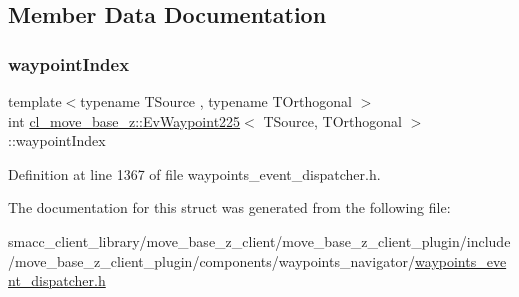 \subsection{Member Data Documentation}
\mbox{\label{structcl__move__base__z_1_1EvWaypoint225_a0770eb0d7a9156e6aa75406eb56d97b4}} 
\subsubsection{\texorpdfstring{waypoint\+Index}{waypointIndex}}
{\footnotesize\ttfamily template$<$typename T\+Source , typename T\+Orthogonal $>$ \\
int \hyperlink{structcl__move__base__z_1_1EvWaypoint225}{cl\+\_\+move\+\_\+base\+\_\+z\+::\+Ev\+Waypoint225}$<$ T\+Source, T\+Orthogonal $>$\+::waypoint\+Index}



Definition at line 1367 of file waypoints\+\_\+event\+\_\+dispatcher.\+h.



The documentation for this struct was generated from the following file\+:\begin{DoxyCompactItemize}
\item 
smacc\+\_\+client\+\_\+library/move\+\_\+base\+\_\+z\+\_\+client/move\+\_\+base\+\_\+z\+\_\+client\+\_\+plugin/include/move\+\_\+base\+\_\+z\+\_\+client\+\_\+plugin/components/waypoints\+\_\+navigator/\hyperlink{waypoints__event__dispatcher_8h}{waypoints\+\_\+event\+\_\+dispatcher.\+h}\end{DoxyCompactItemize}
